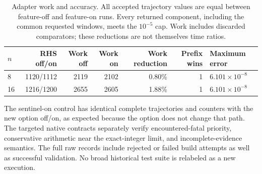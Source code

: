 \begin{table}[t]
\caption{Adapter work and accuracy. All accepted trajectory values are equal
between feature-off and feature-on runs. Every returned component, including
the common requested windows, meets the $10^{-5}$ cap. Work includes discarded
comparators; these reductions are not themselves time ratios.}
\label{tab:adapter-work}
\begin{ruledtabular}
\begin{tabular}{lrrrrrl}
$n$ & RHS off/on & Work off & Work on & Work reduction & Prefix wins & Maximum error\\
\hline
8 & 1120/1112 & 2119 & 2102 & 0.80\% & 1 & $6.101\times10^{-8}$ \\
16 & 1216/1200 & 2655 & 2605 & 1.88\% & 1 & $6.101\times10^{-8}$ \\
\end{tabular}
\end{ruledtabular}
\end{table}
The sentinel-on control has identical complete trajectories and counters with
the new option off/on, as expected because the option does not change that path.
The targeted native contracts separately verify encountered-fatal priority,
conservative arithmetic near the exact-integer limit, and incomplete-evidence
semantics. The full raw records include rejected or failed build attempts as
well as successful validation. No broad historical test suite is relabeled
as a new execution.

